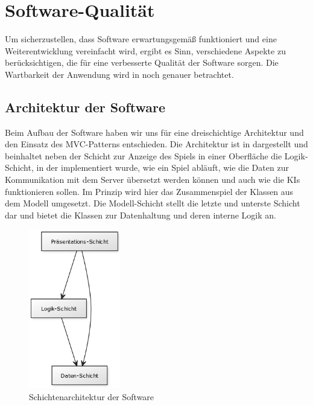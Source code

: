 \chapter{Software-Qualität}
\label{ch:software-qualitaet}

Um sicherzustellen, dass Software erwartungsgemäß funktioniert und eine Weiterentwicklung vereinfacht wird, ergibt es
Sinn, verschiedene Aspekte zu berücksichtigen, die für eine verbesserte Qualität der Software sorgen.
Die Wartbarkeit der Anwendung wird in  noch genauer betrachtet.

\section{Architektur der Software}
\label{sec:software-architektur}

Beim Aufbau der Software haben wir uns für eine dreischichtige Architektur und den Einsatz des \ac{MVC}-Patterns
entschieden.
Die Architektur ist in  dargestellt und beinhaltet neben der Schicht zur Anzeige
des Spiels in einer Oberfläche die Logik-Schicht, in der \ua implementiert wurde, wie ein Spiel abläuft, wie
die Daten zur Kommunikation mit dem Server übersetzt werden können und auch wie die \ac{KI}s funktionieren sollen.
Im Prinzip wird hier das Zusammenspiel der Klassen aus dem Modell umgesetzt.
Die Modell-Schicht stellt die letzte und unterste Schicht dar und bietet die Klassen zur Datenhaltung und deren interne
Logik an. \\

\begin{figure}[htb]
\centering
\includegraphics[width=4cm]{Bilder/Diagramm_Schichtenmodell.png}
\caption{Schichtenarchitektur der Software}
\label{fig:schichtenarchitektur}
\end{figure}


